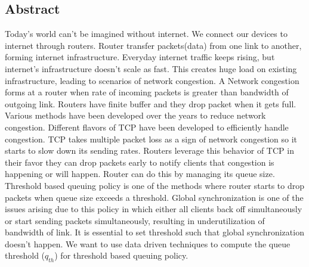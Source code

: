 \begin{flushright}
\huge{\section*{Abstract}}
\end{flushright}
Today's world can't be imagined without internet. We connect our devices to internet through routers. Router transfer packets(data) from one link to another, forming internet infrastructure. Everyday internet traffic keeps rising, but internet's infrastructure doesn't scale as fast. This creates huge load on existing infrastructure, leading to scenarios of network congestion. A Network congestion forms at a router when rate of incoming packets is greater than bandwidth of outgoing link. Routers have finite buffer and they drop packet when it gets full. Various methods have been developed over the years to reduce network congestion. Different flavors of TCP have been developed to efficiently handle congestion. TCP takes multiple packet loss as a sign of network congestion so it starts to slow down its sending rates. Routers leverage this behavior of TCP in their favor they can drop packets early to notify clients that congestion is happening or will happen. Router can do this by managing its queue size. Threshold based queuing policy is one of the methods where router starts to drop packets when queue size exceeds a threshold. Global synchronization is one of the issues arising due to this policy in which either all clients back off simultaneously or start sending packets simultaneously, resulting in underutilization of bandwidth of link. It is essential to set threshold such that global synchronization doesn't happen. We want to use data driven techniques to compute the queue threshold ($ q_{th} $) for threshold based queuing policy. 
